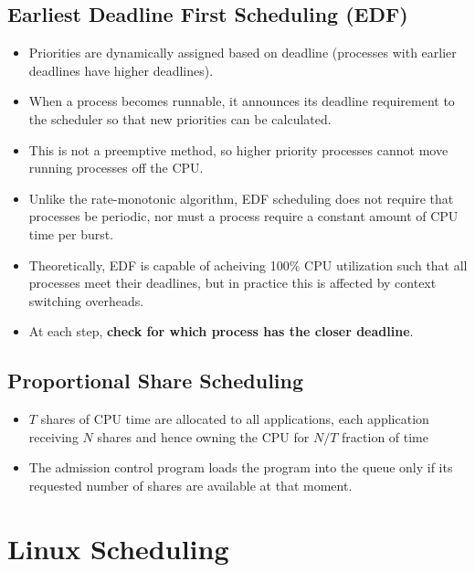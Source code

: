 \documentclass{article}
\theoremstyle{plain}
\theoremstyle{definition}
\begin{document}
\subsection{Earliest Deadline First Scheduling (EDF)}
\begin{itemize}
    \item Priorities are dynamically assigned based on deadline (processes with earlier deadlines have higher deadlines).
    
    \item When a process becomes runnable, it announces its deadline requirement to the scheduler so that new priorities can be calculated.
    
    \item This is not a preemptive method, so higher priority processes cannot move running processes off the CPU.
    
    \item Unlike the rate-monotonic algorithm, EDF scheduling does not require that processes be periodic, nor must a process require a constant amount of CPU time per burst.
    
    \item Theoretically, EDF is capable of acheiving 100\% CPU utilization such that all processes meet their deadlines, but in practice this is affected by context switching overheads.
    
    \item At each step, \textbf{check for which process has the closer deadline}.
\end{itemize}

\subsection{Proportional Share Scheduling}
\begin{itemize}
    \item $T$ shares of CPU time are allocated to all applications, each application receiving $N$ shares and hence owning the CPU for $N/T$ fraction of time
    
    \item The admission control program loads the program into the queue only if its requested number of shares are available at that moment. 
\end{itemize}

\section{Linux Scheduling}
\end{document}
